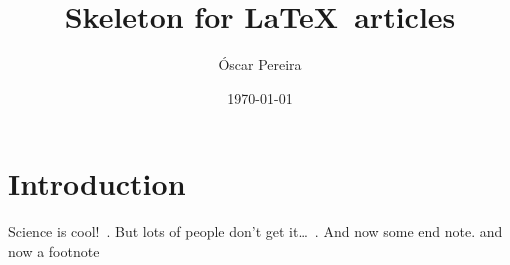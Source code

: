 \documentclass[a4paper,12pt,dvipsnames*]{report}
\title{
Skeleton for \LaTeX\ articles  %
}
\author{
  {Óscar Pereira}\fn{\texttt{\{https://, oscar@\}randomwalk.eu}.}
}
\date{\today}
\begin{document}
\maketitle

\tableofcontents

\chapter{Introduction}
\label{chap:intro}
Science is cool!~\cite{Sagan}. But lots of people don't get it\ldots~\cite{Feynman74}. And now some end note. and now a footnote

\iffootnotesonly
\else
  \clearpage
  \printendnotes
\fi

\clearpage
{}
{}


\end{document}

